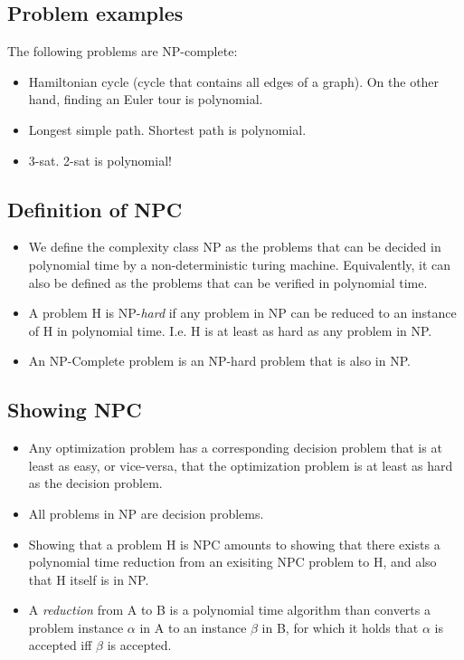 \newcommand{\NP}{\mathop{\text{NP}}}
\newcommand{\CNP}{\mathop{\text{co-NP}}}
\renewcommand{\P}{\mathop{\text{P}}}

\subsection{Problem examples}
The following problems are NP-complete:
\begin{itemize}
\item Hamiltonian cycle (cycle that contains all edges of a graph). On
  the other hand, finding an Euler tour is polynomial.
\item Longest simple path. Shortest path is polynomial.
\item 3-sat. 2-sat is polynomial!
\end{itemize}

\subsection{Definition of NPC}
\begin{itemize}
\item We define the complexity class NP as the problems that can be
  decided in polynomial time by a non-deterministic turing
  machine. Equivalently, it can also be defined as the problems that
  can be verified in polynomial time.
\item A problem H is NP-\emph{hard} if any problem in NP can be
  reduced to an instance of H in polynomial time. I.e. H is at least
  as hard as any problem in NP.
\item An NP-Complete problem is an NP-hard problem that is also in NP.
\end{itemize}

\subsection{Showing NPC}
\begin{itemize}
\item Any optimization problem has a corresponding decision problem
  that is at least as easy, or vice-versa, that the optimization
  problem is at least as hard as the decision problem.
\item All problems in NP are decision problems.
\item Showing that a problem H is NPC amounts to showing that there
  exists a polynomial time reduction from an exisiting NPC problem to
  H, and also that H itself is in NP.
\item A \emph{reduction} from A to B is a polynomial time algorithm
  than converts a problem instance $\alpha$ in A to an instance
  $\beta$ in B, for which it holds that $\alpha$ is accepted iff
  $\beta$ is accepted.
\end{itemize}

